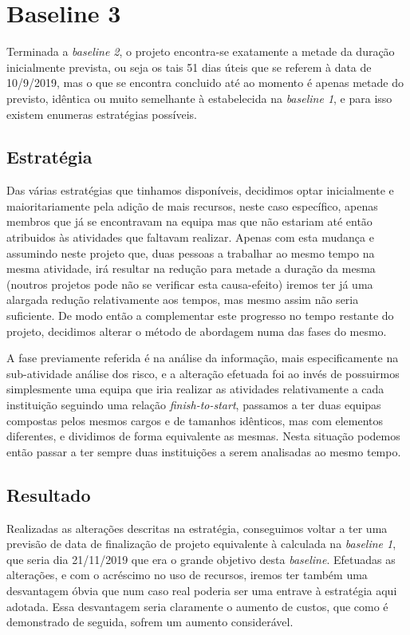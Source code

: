 \section{Baseline 3}
Terminada a \textit{baseline 2}, o projeto encontra-se exatamente a metade da duração inicialmente prevista, ou seja os tais 51 dias úteis que se referem à data de 10/9/2019, mas o que se encontra concluido até ao momento é apenas metade do previsto, idêntica ou muito semelhante à estabelecida na \textit{baseline 1}, e para isso existem enumeras estratégias possíveis.
\subsection{Estratégia}
Das várias estratégias que tinhamos disponíveis, decidimos optar inicialmente e maioritariamente pela adição de mais recursos, neste caso específico, apenas membros que já se encontravam na equipa mas que não estariam até então atribuidos às atividades que faltavam realizar. Apenas com esta mudança e assumindo neste projeto que, duas pessoas a trabalhar ao mesmo tempo na mesma atividade, irá resultar na redução para metade a duração da mesma (noutros projetos pode não se verificar esta causa-efeito) iremos ter já uma alargada redução relativamente aos tempos, mas mesmo assim não seria suficiente. De modo então a complementar este progresso no tempo restante do projeto, decidimos alterar o método de abordagem numa das fases do mesmo.

A fase previamente referida é na análise da informação, mais especificamente na sub-atividade análise dos risco, e a alteração efetuada foi ao invés de possuirmos simplesmente uma equipa que iria realizar as atividades relativamente a cada instituição seguindo uma relação \textit{finish-to-start}, passamos a ter duas equipas compostas pelos mesmos cargos e de tamanhos idênticos, mas com elementos diferentes, e dividimos de forma equivalente as mesmas. Nesta situação podemos então passar a ter sempre duas instituições a serem analisadas ao mesmo tempo.

\subsection{Resultado}
Realizadas as alterações descritas na estratégia, conseguimos voltar a ter uma previsão de data de finalização de projeto equivalente à calculada na \textit{baseline 1}, que seria dia 21/11/2019 que era o grande objetivo desta \textit{baseline}.
Efetuadas as alterações, e com o acréscimo no uso de recursos, iremos ter também uma desvantagem óbvia que num caso real poderia ser uma entrave à estratégia aqui adotada. Essa desvantagem seria claramente o aumento de custos, que como é demonstrado de seguida, sofrem um aumento considerável.


